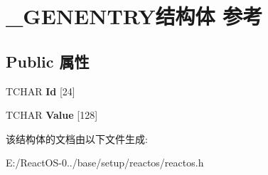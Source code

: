 \hypertarget{struct___g_e_n_e_n_t_r_y}{}\section{\+\_\+\+G\+E\+N\+E\+N\+T\+R\+Y结构体 参考}
\label{struct___g_e_n_e_n_t_r_y}
\subsection*{Public 属性}
\begin{DoxyCompactItemize}
\item 
\mbox{\label{struct___g_e_n_e_n_t_r_y_a5173104657384747ee0e5b7920762669}} 
T\+C\+H\+AR {\bfseries Id} \mbox{[}24\mbox{]}
\item 
\mbox{\label{struct___g_e_n_e_n_t_r_y_a43864853f4d83e1d6aa1076192d9b160}} 
T\+C\+H\+AR {\bfseries Value} \mbox{[}128\mbox{]}
\end{DoxyCompactItemize}


该结构体的文档由以下文件生成\+:\begin{DoxyCompactItemize}
\item 
E\+:/\+React\+O\+S-\/0../base/setup/reactos/reactos.\+h\end{DoxyCompactItemize}
